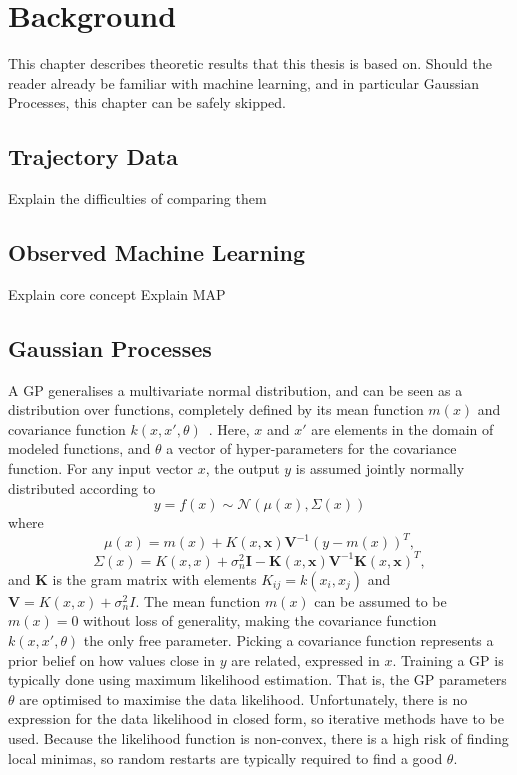 \chapter{Background}
This chapter describes theoretic results that this thesis is based
on. Should the reader already be familiar with machine learning, and
in particular Gaussian Processes, this chapter can be safely skipped.

\section{Trajectory Data}
Explain the difficulties of comparing them

\section{Observed Machine Learning}
Explain core concept
Explain MAP

\section{Gaussian Processes}
A GP generalises a multivariate normal distribution, and can be seen
as a distribution over functions, completely defined by its
mean function $m(x)$ and covariance function $k(x, x',
\theta)$~\cite{Rasmussen-Williams-2006}. Here, $x$ and $x'$ are
elements in the domain of modeled functions, and $\theta$ a
vector of hyper-parameters for the covariance function. For any input
vector $x$, the output $y$ is assumed jointly normally distributed according to
\begin{equation}
  \label{eq:gp}
  y = f(x) \sim \mathcal{N}(\mu(x), \Sigma(x))
\end{equation}
where
\begin{equation}
  \label{eq:gp-mean-function}
  \mu(x) = m(x) + K(x, \textbf{x})\textbf{V}^{-1}{(y-m(x))}^{T},
\end{equation}
\begin{equation}
  \label{eq:gp-covariance-function}
  \Sigma(x) = K(x, x) + \sigma^{2}_n\textbf{I} - \textbf{K}(x, \textbf{x})\textbf{V}^{-1}{\textbf{K}(x, \textbf{x})}^{T},
\end{equation}
and $\textbf{K}$ is the gram matrix with elements $K_{ij} = k(x_i, x_j)$ and $\textbf{V}
= K(x, x) + \sigma_n^2I$.
The mean function $m(x)$ can be assumed to be $m(x) = 0$
without loss of generality, making the covariance function $k(x, x', \theta)$
the only free parameter. Picking a covariance function represents a prior
belief on how values close in $y$ are related, expressed in $x$. 
Training a GP is typically done using maximum likelihood
estimation. That is, the GP parameters $\theta$ are optimised to
maximise the data likelihood. Unfortunately,
there is no expression for the data likelihood in closed form, so
iterative methods have to be used. Because the likelihood function is
non-convex, there is a high risk of finding local minimas,
so random restarts are typically required to find a good $\theta$.

